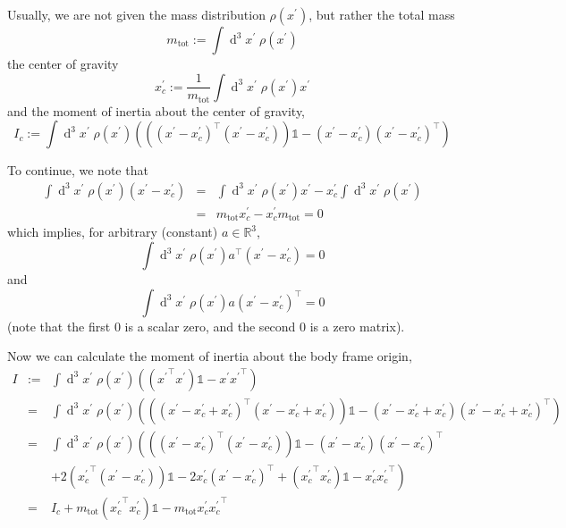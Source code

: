 \documentclass[a4paper]{article}
\begin{document}
Usually, we are not given the mass distribution $\rho(x^\prime)$, but rather the total mass
\begin{equation}
m_\mathrm{tot} := \int \operatorname{d}^3\!x^\prime\; \rho(x^\prime)
\end{equation}
the center of gravity
\begin{equation}
\label{eqn:xpcdef}
x_c^\prime := \frac{1}{m_\mathrm{tot}} \int \operatorname{d}^3\!x^\prime\; \rho(x^\prime) x^\prime
\end{equation}
and the moment of inertia about the center of gravity,
\begin{equation}
I_c := \int \operatorname{d}^3\!x^\prime\; \rho(x^\prime) \left( ( (x^\prime - x_c^\prime)^\top (x^\prime - x_c^\prime) ) \mathbb{1} - (x^\prime - x_c^\prime)(x^\prime - x_c^\prime)^\top \right)
\end{equation}

To continue, we note that
\begin{eqnarray}
\nonumber \int \operatorname{d}^3\!x^\prime\; \rho(x^\prime) (x^\prime - x_c^\prime)
&=& \int \operatorname{d}^3\!x^\prime\; \rho(x^\prime) x^\prime
- x_c^\prime \int \operatorname{d}^3\!x^\prime\; \rho(x^\prime)\\
&=& m_\mathrm{tot} x_c^\prime - x_c^\prime m_\mathrm{tot} = 0
\end{eqnarray}
which implies, for arbitrary (constant) $a \in \mathbb{R}^3$,
\begin{equation}
\int \operatorname{d}^3\!x^\prime\; \rho(x^\prime) a^\top (x^\prime - x_c^\prime) = 0
\end{equation}
and
\begin{equation}
\int \operatorname{d}^3\!x^\prime\; \rho(x^\prime) a (x^\prime - x_c^\prime)^\top = 0
\end{equation}
(note that the first 0 is a scalar zero, and the second 0 is a zero matrix).

Now we can calculate the moment of inertia about the body frame origin,
\begin{eqnarray}
\label{eqn:i}
\nonumber I &:=& \int \operatorname{d}^3\!x^\prime\; \rho(x^\prime) \left( ({x^\prime}^\top x^\prime) \mathbb{1} - x^\prime {x^\prime}^\top \right)\\
\nonumber&=& \int \operatorname{d}^3\!x^\prime\; \rho(x^\prime) \left( ((x^\prime - x_c^\prime + x_c^\prime)^\top (x^\prime - x_c^\prime + x_c^\prime)) \mathbb{1} - (x^\prime - x_c^\prime + x_c^\prime)(x^\prime - x_c^\prime + x_c^\prime)^\top \right)\\
\nonumber&=& \int \operatorname{d}^3\!x^\prime\; \rho(x^\prime) \left( ((x^\prime - x_c^\prime)^\top (x^\prime - x_c^\prime)) \mathbb{1} - (x^\prime - x_c^\prime)(x^\prime - x_c^\prime)^\top \right.\\
\nonumber && \left. + 2 ({x_c^\prime}^\top (x^\prime - x_c^\prime)) \mathbb{1} - 2 x_c^\prime (x^\prime - x_c^\prime)^\top + ({x_c^\prime}^\top x_c^\prime) \mathbb{1} - x_c^\prime {x_c^\prime}^\top \right)\\
&=& I_c + m_\mathrm{tot}({x_c^\prime}^\top x_c^\prime) \mathbb{1} - m_\mathrm{tot}x_c^\prime {x_c^\prime}^\top
\end{eqnarray}
\end{document}
